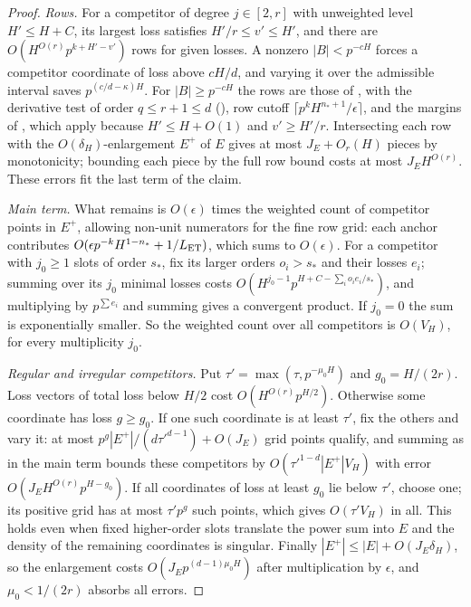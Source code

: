 \documentclass[11pt]{article}
\begin{document}
\begin{proof}
\emph{Rows.} For a competitor of degree $j\in[2,r]$ with unweighted level $H'\le H+C$, its largest loss satisfies
$H'/r\le v'\le H'$, and there are $O(H^{O(r)}p^{k+H'-v'})$ rows for given losses. A nonzero $|B|<p^{-cH}$ forces a
competitor coordinate of loss above $cH/d$, and varying it over the admissible interval saves
$p^{(c/d-\kappa)H}$. For $|B|\ge p^{-cH}$ the rows are those of , with the derivative test of
order $q\le r+1\le d$ (), row cutoff $\lceil p^kH^{n_*+1}/\epsilon\rceil$, and the margins of
, which apply because $H'\le H+O(1)$ and $v'\ge H'/r$. Intersecting each row with the
$O(\delta_H)$-enlargement $E^+$ of $E$ gives at most $J_E+O_r(H)$ pieces by monotonicity; bounding each piece by the
full row bound costs at most $J_EH^{O(r)}$. These errors fit the last term of the claim.

\emph{Main term.} What remains is $O(\epsilon)$ times the weighted count of competitor points in $E^+$, allowing
non-unit numerators for the fine row grid: each anchor contributes $O(\epsilon p^{-k}H^{1-n_*}+1/L_{\rm ET})$, which
sums to $O(\epsilon)$. For a competitor with $j_0\ge1$ slots of order $s_*$, fix its larger orders $o_i>s_*$ and their
losses $e_i$; summing over its $j_0$ minimal losses costs $O(H^{j_0-1}p^{H+C-\sum_io_ie_i/s_*})$, and multiplying by
$p^{\sum e_i}$ and summing gives a convergent product. If $j_0=0$ the sum is exponentially smaller. So the weighted
count over all competitors is $O(V_H)$, for every multiplicity $j_0$.

\emph{Regular and irregular competitors.} Put $\tau'=\max(\tau,p^{-\mu_0H})$ and $g_0=H/(2r)$. Loss vectors of total
loss below $H/2$ cost $O(H^{O(r)}p^{H/2})$. Otherwise some coordinate has loss $g\ge g_0$. If one such coordinate is
at least $\tau'$, fix the others and vary it: at most $p^g|E^+|/(d\tau'^{d-1})+O(J_E)$ grid points qualify, and
summing as in the main term bounds these competitors by $O(\tau'^{1-d}|E^+|V_H)$ with error $O(J_EH^{O(r)}p^{H-g_0})$.
If all coordinates of loss at least $g_0$ lie below $\tau'$, choose one; its positive grid has at most $\tau'p^g$
such points, which gives $O(\tau'V_H)$ in all. This holds even when fixed higher-order slots translate the power sum
into $E$ and the density of the remaining coordinates is singular. Finally $|E^+|\le|E|+O(J_E\delta_H)$, so the
enlargement costs $O(J_Ep^{(d-1)\mu_0H})$ after multiplication by $\epsilon$, and $\mu_0<1/(2r)$ absorbs all errors.
\end{proof}
\end{document}
